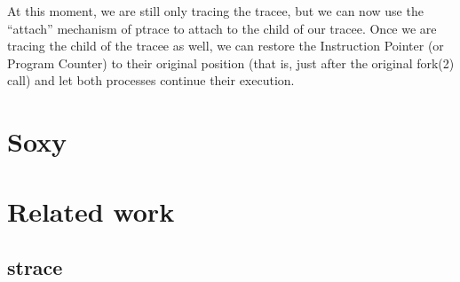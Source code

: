 \documentclass[a4paper, twoside, 10pt, twocolumn]{report}
\begin{document}
At this moment, we are still only tracing the tracee, but we can now use the
``attach'' mechanism of ptrace to attach to the child of our tracee. Once we are
tracing the child of the tracee as well, we can restore the Instruction Pointer
(or Program Counter) to their original position (that is, just after the
original fork(2) call) and let both processes continue their execution.


\chapter{Soxy}

\chapter{Related work}

\section{strace}

\end{document}
